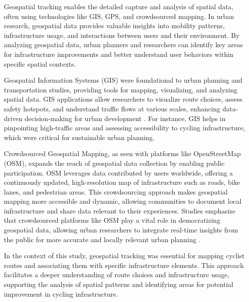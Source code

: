 Geospatial tracking enables the detailed capture and analysis of spatial data, often using technologies like GIS, GPS, and crowdsourced mapping. In urban research, geospatial data provides valuable insights into mobility patterns, infrastructure usage, and interactions between users and their environment. By analyzing geospatial data, urban planners and researchers can identify key areas for infrastructure improvements and better understand user behaviors within specific spatial contexts.

Geospatial Information Systems (GIS) were foundational to urban planning and transportation studies, providing tools for mapping, visualizing, and analyzing spatial data. GIS applications allow researchers to visualize route choices, assess safety hotspots, and understand traffic flows at various scales, enhancing data-driven decision-making for urban development \citep{Mutuli2024:GISTranspo}. For instance, GIS helps in pinpointing high-traffic areas and assessing accessibility to cycling infrastructure, which were critical for sustainable urban planning.

Crowdsourced Geospatial Mapping, as seen with platforms like OpenStreetMap (OSM), expands the reach of geospatial data collection by enabling public participation. OSM leverages data contributed by users worldwide, offering a continuously updated, high-resolution map of infrastructure such as roads, bike lanes, and pedestrian areas. This crowdsourcing approach makes geospatial mapping more accessible and dynamic, allowing communities to document local infrastructure and share data relevant to their experiences. Studies emphasize that crowdsourced platforms like OSM play a vital role in democratizing geospatial data, allowing urban researchers to integrate real-time insights from the public for more accurate and locally relevant urban planning \citep{Mobasheri2020:OpensourceGeospatial}.

In the context of this study, geospatial tracking was essential for mapping cyclist routes and associating them with specific infrastructure elements. This approach facilitates a deeper understanding of route choices and infrastructure usage, supporting the analysis of spatial patterns and identifying areas for potential improvement in cycling infrastructure.

